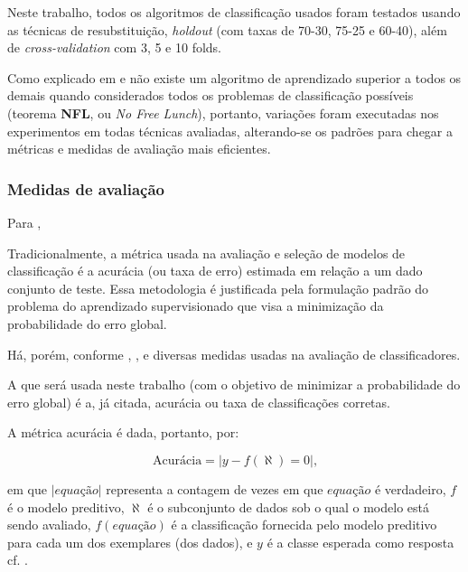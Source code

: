 Neste trabalho, todos os algoritmos de classificação usados foram testados usando as técnicas de resubstituição, \textit{holdout} (com taxas de 70-30, 75-25 e 60-40), além de \textit{cross-validation} com 3, 5 e 10 folds. 

Como explicado em  e  não existe um algoritmo de aprendizado superior a todos os demais quando considerados todos os problemas de classificação possíveis (teorema \textbf{NFL}, ou \textit{No Free Lunch}), portanto, variações foram executadas nos experimentos em todas técnicas avaliadas, alterando-se os padrões para chegar a métricas e medidas de avaliação mais eficientes.

\subsubsection{Medidas de avaliação}\label{medidas_avaliacao}

Para , 
\begin{citacao}
	Tradicionalmente, a métrica usada na avaliação e seleção de modelos de classificação é a acurácia (ou taxa de erro) estimada em relação a um dado conjunto de teste. Essa metodologia é justificada pela formulação padrão do problema do aprendizado supervisionado que visa a minimização da probabilidade do erro global. 
\end{citacao}

Há, porém, conforme , ,  e  diversas medidas usadas na avaliação de classificadores. 

A que será usada neste trabalho (com o objetivo de minimizar a probabilidade do erro global) é a, já citada, acurácia ou taxa de classificações corretas. 

A métrica acurácia é dada, portanto, por:

\begin{equation}\label{acuracia}
	\textrm{Acurácia} = |y-f(\aleph)=0|\textrm{,}
\end{equation}

em que $|equação|$ representa a contagem de vezes em que $equação$ é verdadeiro, $f$ é o modelo preditivo, $\aleph$ é o subconjunto de dados sob o qual o modelo está sendo avaliado, $f(equação)$ é a classificação fornecida pelo modelo preditivo para cada um dos exemplares (dos dados), e $y$ é a classe esperada como resposta cf. .

